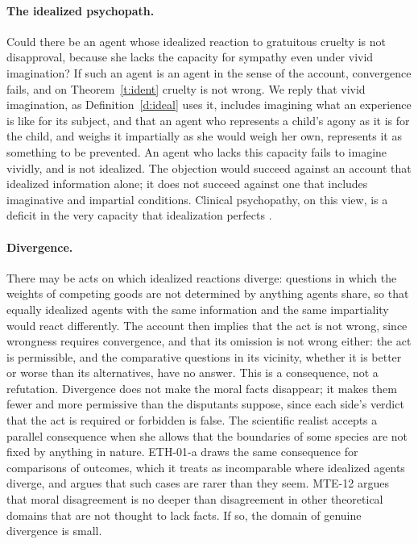 \documentclass{situationist-preprint}
\begin{document}
\paragraph{The idealized psychopath.} Could there be an agent whose idealized reaction to gratuitous cruelty is not disapproval, because she lacks the capacity for sympathy even under vivid imagination? If such an agent is an agent in the sense of the account, convergence fails, and on Theorem~\ref{t:ident} cruelty is not wrong. We reply that vivid imagination, as Definition~\ref{d:ideal} uses it, includes imagining what an experience is like for its subject, and that an agent who represents a child's agony as it is for the child, and weighs it impartially as she would weigh her own, represents it as something to be prevented. An agent who lacks this capacity fails to imagine vividly, and is not idealized. The objection would succeed against an account that idealized information alone; it does not succeed against one that includes imaginative and impartial conditions. Clinical psychopathy, on this view, is a deficit in the very capacity that idealization perfects \citep[cf.][]{Smith1994}.

\paragraph{Divergence.} There may be acts on which idealized reactions diverge: questions in which the weights of competing goods are not determined by anything agents share, so that equally idealized agents with the same information and the same impartiality would react differently. The account then implies that the act is not wrong, since wrongness requires convergence, and that its omission is not wrong either: the act is permissible, and the comparative questions in its vicinity, whether it is better or worse than its alternatives, have no answer. This is a consequence, not a refutation. Divergence does not make the moral facts disappear; it makes them fewer and more permissive than the disputants suppose, since each side's verdict that the act is required or forbidden is false. The scientific realist accepts a parallel consequence when she allows that the boundaries of some species are not fixed by anything in nature. ETH-01-a draws the same consequence for comparisons of outcomes, which it treats as incomparable where idealized agents diverge, and argues that such cases are rarer than they seem. MTE-12 argues that moral disagreement is no deeper than disagreement in other theoretical domains that are not thought to lack facts. If so, the domain of genuine divergence is small.
\end{document}
